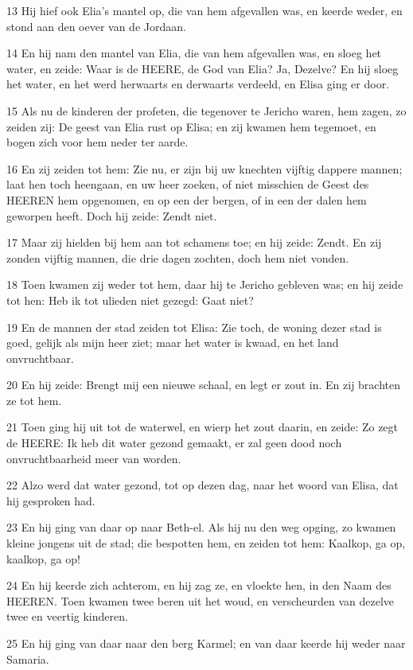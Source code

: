 \par 13 Hij hief ook Elia's mantel op, die van hem afgevallen was, en keerde weder, en stond aan den oever van de Jordaan.
\par 14 En hij nam den mantel van Elia, die van hem afgevallen was, en sloeg het water, en zeide: Waar is de HEERE, de God van Elia? Ja, Dezelve? En hij sloeg het water, en het werd herwaarts en derwaarts verdeeld, en Elisa ging er door.
\par 15 Als nu de kinderen der profeten, die tegenover te Jericho waren, hem zagen, zo zeiden zij: De geest van Elia rust op Elisa; en zij kwamen hem tegemoet, en bogen zich voor hem neder ter aarde.
\par 16 En zij zeiden tot hem: Zie nu, er zijn bij uw knechten vijftig dappere mannen; laat hen toch heengaan, en uw heer zoeken, of niet misschien de Geest des HEEREN hem opgenomen, en op een der bergen, of in een der dalen hem geworpen heeft. Doch hij zeide: Zendt niet.
\par 17 Maar zij hielden bij hem aan tot schamens toe; en hij zeide: Zendt. En zij zonden vijftig mannen, die drie dagen zochten, doch hem niet vonden.
\par 18 Toen kwamen zij weder tot hem, daar hij te Jericho gebleven was; en hij zeide tot hen: Heb ik tot ulieden niet gezegd: Gaat niet?
\par 19 En de mannen der stad zeiden tot Elisa: Zie toch, de woning dezer stad is goed, gelijk als mijn heer ziet; maar het water is kwaad, en het land onvruchtbaar.
\par 20 En hij zeide: Brengt mij een nieuwe schaal, en legt er zout in. En zij brachten ze tot hem.
\par 21 Toen ging hij uit tot de waterwel, en wierp het zout daarin, en zeide: Zo zegt de HEERE: Ik heb dit water gezond gemaakt, er zal geen dood noch onvruchtbaarheid meer van worden.
\par 22 Alzo werd dat water gezond, tot op dezen dag, naar het woord van Elisa, dat hij gesproken had.
\par 23 En hij ging van daar op naar Beth-el. Als hij nu den weg opging, zo kwamen kleine jongens uit de stad; die bespotten hem, en zeiden tot hem: Kaalkop, ga op, kaalkop, ga op!
\par 24 En hij keerde zich achterom, en hij zag ze, en vloekte hen, in den Naam des HEEREN. Toen kwamen twee beren uit het woud, en verscheurden van dezelve twee en veertig kinderen.
\par 25 En hij ging van daar naar den berg Karmel; en van daar keerde hij weder naar Samaria.

